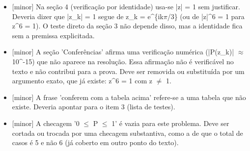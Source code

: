 \documentclass{article}%
\begin{document}
\begin{itemize}%
\item%
{[}minor{]} Na seção 4 (verificação por identidade) usa{-}se |z| = 1 sem justificar. Deveria dizer que |z\_k| = 1 segue de z\_k = e\^{}\{ik$\pi$/3\} (ou de |z|\^{}6 = 1 para z\^{}6 = 1). O teste direto da seção 3 não depende disso, mas a identidade fica sem a premissa explicitada.%
\item%
{[}minor{]} A seção 'Conferências' afirma uma verificação numérica (|P(z\_k)| $\approx$ 10\^{}{-}15) que não aparece na resolução. Essa afirmação não é verificável no texto e não contribui para a prova. Deve ser removida ou substituída por um argumento exato, que já existe: z\^{}6 = 1 com z $\neq$ 1.%
\item%
{[}minor{]} A frase 'conferem com a tabela acima' refere{-}se a uma tabela que não existe. Deveria apontar para o item 3 (lista de testes).%
\item%
{[}minor{]} A checagem '0 $\leq$ P $\leq$ 1' é vazia para este problema. Deve ser cortada ou trocada por uma checagem substantiva, como a de que o total de casos é 5 e não 6 (já coberto em outro ponto do texto).%
\end{itemize}%
\end{document}
